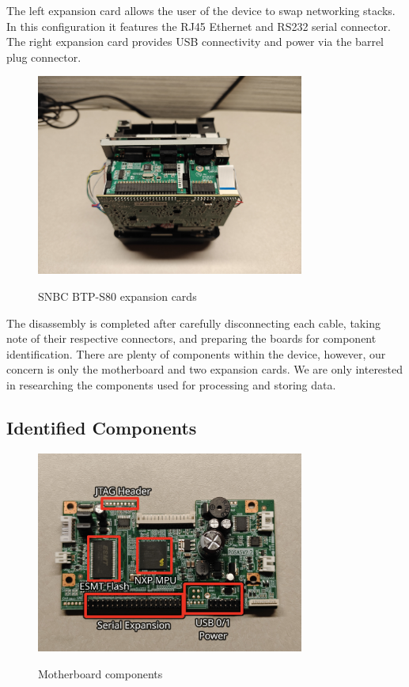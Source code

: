 The left expansion card allows the user of the device to swap networking stacks. In this configuration it features the RJ45 Ethernet and RS232 serial connector. The right expansion card provides USB connectivity and power via the barrel plug connector. 

\begin{figure}[ht]
    \centering
    {\includegraphics[width=88mm,scale=0.5]
    {Figures/Teardown/IMG20231204171002.jpg}}
    \caption{SNBC BTP-S80 expansion cards}
    \label{fig:snbc_btp_s80_expansion}
\end{figure}

The disassembly is completed after carefully disconnecting each cable, taking note of their respective connectors, and preparing the boards for component identification. There are plenty of components within the device, however, our concern is only the motherboard and two expansion cards. We are only interested in researching the components used for processing and storing data.


\subsection{Identified Components} \label{identifiedcomponents}



\begin{figure}[ht]
    \centering
    {\includegraphics[width=88mm,scale=0.5]
    {Figures/Teardown/IMG20231204171516_annotated.jpg}}
    \caption{Motherboard components}
    \label{fig:snbc_btp_s80_motherboard}
\end{figure}

